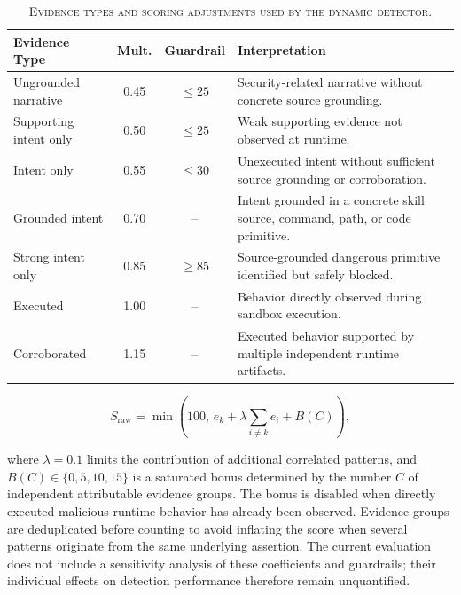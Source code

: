 \begin{table}[!t]
\centering
\caption{\textsc{Evidence types and scoring adjustments used by the dynamic detector.}}
\label{tab:dynamic_evidence_weights}
\small
\renewcommand{\arraystretch}{1.08}
\setlength{\tabcolsep}{2pt}

\begin{tabularx}{\textwidth}{l c c >{\RaggedRight\arraybackslash}X}
\toprule
\textbf{Evidence Type}
& \textbf{Mult.}
& \textbf{Guardrail}
& \textbf{Interpretation} \\
\midrule

Ungrounded narrative
& 0.45
& $\leq 25$
& Security-related narrative without concrete source grounding. \\

\rowcolor[HTML]{F2F2F2}
Supporting intent only
& 0.50
& $\leq 25$
& Weak supporting evidence not observed at runtime. \\

Intent only
& 0.55
& $\leq 30$
& Unexecuted intent without sufficient source grounding or corroboration. \\

\rowcolor[HTML]{F2F2F2}
Grounded intent
& 0.70
& --
& Intent grounded in a concrete skill source, command, path, or code primitive. \\

Strong intent only
& 0.85
& $\geq 85$
& Source-grounded dangerous primitive identified but safely blocked. \\

\rowcolor[HTML]{F2F2F2}
Executed
& 1.00
& --
& Behavior directly observed during sandbox execution. \\

Corroborated
& 1.15
& --
& Executed behavior supported by multiple independent runtime artifacts. \\

\bottomrule
\end{tabularx}
\end{table}




\begin{equation}
S_{\mathrm{raw}}
=
\min\left(
100,\,
e_k
+
\lambda\sum_{i\neq k}e_i
+
B(C)
\right),
\label{eq:dynamic_score}
\end{equation}

where $\lambda=0.1$ limits the contribution of additional correlated patterns, and $B(C)\in\{0,5,10,15\}$ is a saturated bonus determined by the number $C$ of independent attributable evidence groups. The bonus is disabled when directly executed malicious runtime behavior has already been observed. Evidence groups are deduplicated before counting to avoid inflating the score when several patterns originate from the same underlying assertion. The current evaluation does not include a sensitivity
analysis of these coefficients and guardrails; their
individual effects on detection performance therefore
remain unquantified.

